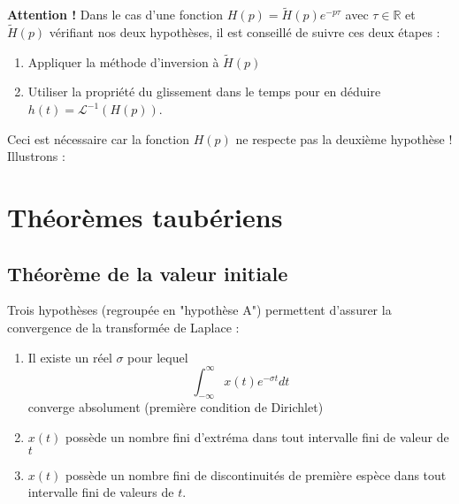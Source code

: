 		\textbf{Attention !} Dans le cas d'une fonction $H(p) = \tilde{H}(p)e^{-p\tau}$ avec $\tau 
		\in \mathbb{R}$ et $\tilde{H}(p)$ vérifiant nos deux hypothèses, il est conseillé de suivre
		ces deux étapes :
		\begin{enumerate}
		\item Appliquer la méthode d'inversion à $\tilde{H}(p)$
		\item Utiliser la propriété du glissement dans le temps pour en déduire $h(t) = \mathcal{L}^{-1}
		(H(p))$.
		\end{enumerate}
		Ceci est nécessaire car la fonction $H(p)$ ne respecte pas la deuxième hypothèse ! Illustrons :\\
		



\section{Théorèmes taubériens}

	\subsection{Théorème de la valeur initiale}
	Trois hypothèses (regroupée en "hypothèse A") permettent d'assurer la convergence de la transformée
	de Laplace :
	\begin{enumerate}
	\item Il existe un réel $\sigma$ pour lequel 
	\begin{equation}
	\int_{-\infty}^{\infty} x(t)e^{-\sigma t}dt
	\end{equation}
	converge absolument (première condition de Dirichlet)
	\item $x(t)$ possède un nombre fini d'extréma dans tout intervalle fini de valeur de$t$
	\item $x(t)$ possède un nombre fini de discontinuités de première espèce dans tout intervalle
	fini de valeurs de $t$.
	\end{enumerate}
	
	\ 
	
